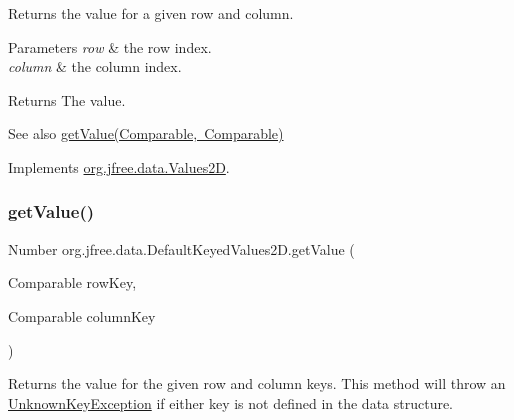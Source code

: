 Returns the value for a given row and column.


\begin{DoxyParams}{Parameters}
{\em row} & the row index. \\
\hline
{\em column} & the column index.\\
\hline
\end{DoxyParams}
\begin{DoxyReturn}{Returns}
The value.
\end{DoxyReturn}
\begin{DoxySeeAlso}{See also}
\mbox{\hyperlink{classorg_1_1jfree_1_1data_1_1_default_keyed_values2_d_a12490c45f6bd535f4cb0bbb5f6127567}{get\+Value(\+Comparable, Comparable)}} 
\end{DoxySeeAlso}


Implements \mbox{\hyperlink{interfaceorg_1_1jfree_1_1data_1_1_values2_d_a0797937d3ac62e18b300eef1fe906ec6}{org.\+jfree.\+data.\+Values2D}}.

\mbox{\label{classorg_1_1jfree_1_1data_1_1_default_keyed_values2_d_a12490c45f6bd535f4cb0bbb5f6127567}} 
\subsubsection{\texorpdfstring{get\+Value()}{getValue()}\hspace{0.1cm}{\footnotesize\ttfamily [2/2]}}
{\footnotesize\ttfamily Number org.\+jfree.\+data.\+Default\+Keyed\+Values2\+D.\+get\+Value (\begin{DoxyParamCaption}\item[{Comparable}]{row\+Key,  }\item[{Comparable}]{column\+Key }\end{DoxyParamCaption})}

Returns the value for the given row and column keys. This method will throw an \mbox{\hyperlink{classorg_1_1jfree_1_1data_1_1_unknown_key_exception}{Unknown\+Key\+Exception}} if either key is not defined in the data structure.


